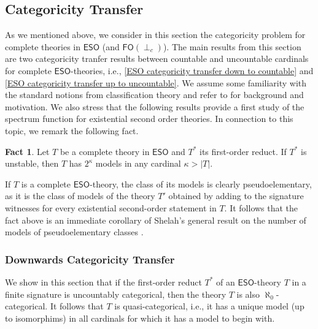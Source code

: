 \documentclass[a4paper]{amsart}
\theoremstyle{definition}
\newtheorem*{fact}{Fact}
\theoremstyle{remark}
\newcommand\eso{\mathsf{ESO}}
\newcommand\foil{\mathsf{FO}(\perp_c)}
\theoremstyle{definition}
\begin{document}
\subsection{Categoricity Transfer}\label{Section_Categoricity}

As we mentioned above, we consider in this section the categoricity problem for complete theories in $\eso$ (and $\foil$). The main results from this section are two categoricity tranfer results between countable and uncountable cardinals for complete $\eso$-theories, i.e., \cref{ESO categoricity transfer down to countable} and \cref{ESO categoricity transfer up to uncountable}.  We assume some familiarity with the standard notions from classification theory and refer to \cite{baldwin_categoricity,poizat2012course,baldwin2017fundamentals,shelah1990classification,tentziegler} for  background and motivation. We also stress that the following results provide a first study of the spectrum function for existential second order theories. In connection to this topic, we remark the following fact.
\begin{fact}
    Let $T$ be a complete theory in $\eso$ and $T^*$ its first-order reduct.  If $T^*$ is unstable, then $T$ has $2^\kappa$ models in any cardinal $\kappa>|T|$.
\end{fact}
\noindent If $T$ is a complete $\eso$-theory, the class of its models is clearly pseudoelementary, as it is the class of models of the theory $T'$ obtained by adding to the signature witnesses for every existential second-order statement in $T$. It follows that the fact above is an immediate corollary of Shelah's general result on the number of models of pseudoelementary classes \cite[Ch. VIII, Thm 2.1]{shelah1990classification}.


\subsubsection{Downwards Categoricity Transfer}\label{section.downwards.categoricity}

We show in this section that if the first-order reduct $T^*$ of an $\eso$-theory $T$ in a finite signature is uncountably categorical, then the theory $T$ is also $\aleph_0$-categorical. It follows that $T$ is quasi-categorical, i.e., it has a unique model (up to isomorphims) in all cardinals for which it has a model to begin with. 
\end{document}
